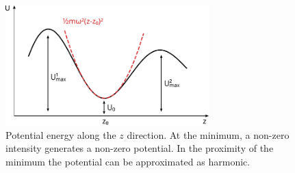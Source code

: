 \begin{figure}
    \centering
    \includegraphics[width=0.7\textwidth]{chapters/chapter_2/figures/offset.pdf}
    \caption{Potential energy along the $z$ direction. At the minimum, a non-zero intensity generates a non-zero potential. In the proximity of the minimum the potential can be approximated as harmonic.}
    \label{fig:offset}
\end{figure}